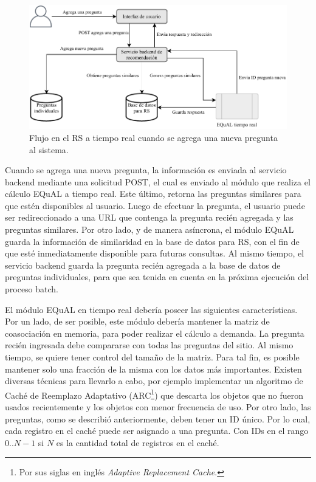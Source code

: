\begin{figure}[h!]
	\centering
	\includegraphics[width=0.9\linewidth]{8_problema_investigacion/imagenes/implementacion_rs_agregar}
	\caption{Flujo en el RS a tiempo real cuando se agrega una nueva pregunta al sistema.}
	\label{fig:implementacionrsagregar}
\end{figure}

\bigskip Cuando se agrega una nueva pregunta, la información es enviada al servicio backend mediante una solicitud POST, el cual es enviado al módulo que realiza el cálculo EQuAL a tiempo real. Este último, retorna las preguntas similares para que estén disponibles al usuario. Luego de efectuar la pregunta, el usuario puede ser redireccionado a una URL que contenga la pregunta recién agregada y las preguntas similares. Por otro lado, y de manera asíncrona, el módulo EQuAL guarda la información de similaridad en la base de datos para RS, con el fin de que esté inmediatamente disponible para futuras consultas. Al mismo tiempo, el servicio backend guarda la pregunta recién agregada a la base de datos de preguntas individuales, para que sea tenida en cuenta en la próxima ejecución del proceso batch.

\bigskip El módulo EQuAL en tiempo real debería poseer las siguientes características. Por un lado, de ser posible, este módulo debería mantener la matriz de coasociación en memoria, para poder realizar el cálculo a demanda. La pregunta recién ingresada debe compararse con todas las preguntas del sitio. Al mismo tiempo, se quiere tener control del tamaño de la matriz. Para tal fin, es posible mantener solo una fracción de la misma con los datos más importantes. Existen diversas técnicas para llevarlo a cabo, por ejemplo implementar un algoritmo de Caché de Reemplazo Adaptativo (ARC\footnote{Por sus siglas en inglés \textit{Adaptive Replacement Cache}.}) que descarta los objetos que no fueron usados recientemente y los objetos con menor frecuencia de uso.  Por otro lado, las preguntas, como se describió anteriormente, deben tener un ID único. Por lo cual, cada registro en el caché puede ser asignado a una pregunta. Con IDs en el rango \(0.. N-1\) si \(N\) es la cantidad total de registros en el caché.

